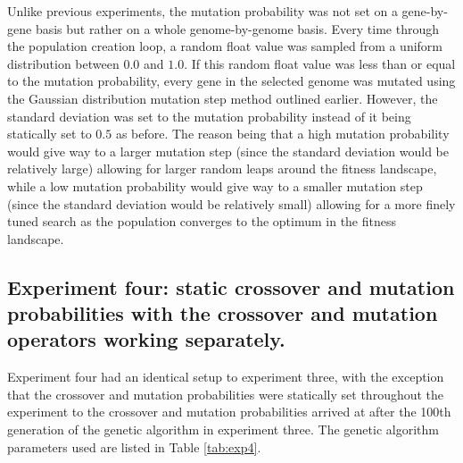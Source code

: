 \vspace{3mm}

Unlike previous experiments, the mutation probability was not set on a gene-by-gene basis but rather on a whole genome-by-genome basis. Every time through the population creation loop, a random float value was sampled from a uniform distribution between $0.0$ and $1.0$. If this random float value was less than or equal to the mutation probability, every gene in the selected genome was mutated using the Gaussian distribution mutation step method outlined earlier. However, the standard deviation was set to the mutation probability instead of it being statically set to $0.5$ as before. The reason being that a high mutation probability would give way to a larger mutation step (since the standard deviation would be relatively large) allowing for larger random leaps around the fitness landscape, while a low mutation probability would give way to a smaller mutation step (since the standard deviation would be relatively small) allowing for a more finely tuned search as the population converges to the optimum in the fitness landscape.

\subsection[Experiment Four]{Experiment four: static crossover and mutation probabilities with the crossover and mutation operators working separately.}

Experiment four had an identical setup to experiment three, with the exception that the crossover and mutation probabilities were statically set throughout the experiment to the crossover and mutation probabilities arrived at after the 100th generation of the genetic algorithm in experiment three. The genetic algorithm parameters used are listed in Table \ref{tab:exp4}.

